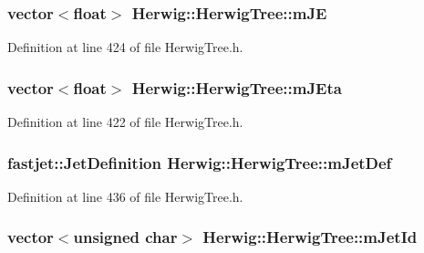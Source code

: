 \subsubsection[{\texorpdfstring{m\+JE}{mJE}}]{\setlength{\rightskip}{0pt plus 5cm}vector$<$float$>$ Herwig\+::\+Herwig\+Tree\+::m\+JE\hspace{0.3cm}{\ttfamily [protected]}}\hypertarget{class_herwig_1_1_herwig_tree_a49f4d5832d02c8e2e317ffb11c4f4f98}{}\label{class_herwig_1_1_herwig_tree_a49f4d5832d02c8e2e317ffb11c4f4f98}


Definition at line 424 of file Herwig\+Tree.\+h.

\subsubsection[{\texorpdfstring{m\+J\+Eta}{mJEta}}]{\setlength{\rightskip}{0pt plus 5cm}vector$<$float$>$ Herwig\+::\+Herwig\+Tree\+::m\+J\+Eta\hspace{0.3cm}{\ttfamily [protected]}}\hypertarget{class_herwig_1_1_herwig_tree_a50b89cfc9ac1d0a0d210483ec0b33584}{}\label{class_herwig_1_1_herwig_tree_a50b89cfc9ac1d0a0d210483ec0b33584}


Definition at line 422 of file Herwig\+Tree.\+h.

\subsubsection[{\texorpdfstring{m\+Jet\+Def}{mJetDef}}]{\setlength{\rightskip}{0pt plus 5cm}fastjet\+::\+Jet\+Definition Herwig\+::\+Herwig\+Tree\+::m\+Jet\+Def\hspace{0.3cm}{\ttfamily [protected]}}\hypertarget{class_herwig_1_1_herwig_tree_ae80b94db0009e26c4b5fbbc0d14d31b3}{}\label{class_herwig_1_1_herwig_tree_ae80b94db0009e26c4b5fbbc0d14d31b3}


Definition at line 436 of file Herwig\+Tree.\+h.

\subsubsection[{\texorpdfstring{m\+Jet\+Id}{mJetId}}]{\setlength{\rightskip}{0pt plus 5cm}vector$<$unsigned char$>$ Herwig\+::\+Herwig\+Tree\+::m\+Jet\+Id\hspace{0.3cm}{\ttfamily [protected]}}\hypertarget{class_herwig_1_1_herwig_tree_a2b7790f57e9e3e44cb10747b0bafdaa1}{}\label{class_herwig_1_1_herwig_tree_a2b7790f57e9e3e44cb10747b0bafdaa1}


